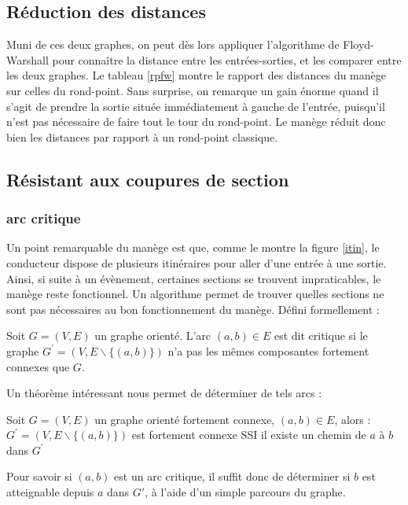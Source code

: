 \documentclass[11pt]{article}
\begin{document}
	
	\subsection{Réduction des distances}
Muni de ces deux graphes, on peut dès lors appliquer l'algorithme de Floyd-Warshall pour connaître la distance entre les entrées-sorties, et les comparer entre les deux graphes. Le tableau \ref{rpfw} montre le rapport des distances du manège sur celles du rond-point. Sans surprise, on remarque un gain énorme quand il s'agit de prendre la sortie située immédiatement à gauche de l'entrée, puisqu'il n'est pas nécessaire de faire tout le tour du rond-point. Le manège réduit donc bien les distances par rapport à un rond-point classique.

	\subsection{Résistant aux coupures de section}
		\subsubsection{arc critique}
	Un point remarquable du manège est que, comme le montre la figure \ref{itin}, le conducteur dispose de plusieurs itinéraires pour aller d'une entrée à une sortie. Ainsi, si suite à un évènement, certaines sections se trouvent impraticables, le manège reste fonctionnel. Un algorithme permet de trouver quelles sections ne sont pas nécessaires au bon fonctionnement du manège. Défini formellement :
\begin{defin}
	Soit $G = (V,E)$ un graphe orienté. L'arc $(a,b) \in E$ est dit critique si le graphe $G^\prime = (V,E\backslash \{(a,b)\})$ n'a pas les mêmes composantes fortement connexes que $G$.
\end{defin}
Un théorème intéressant nous permet de déterminer de tels arcs : 
\begin{theo}
		Soit $G=(V,E)$ un graphe orienté fortement connexe, $(a,b) \in E$, alors :
		$G^\prime = (V,E\backslash \{ (a,b) \})$ est fortement connexe SSI il existe un chemin de $a$ à $b$
		dans $G^\prime$
\end{theo}
Pour savoir si $(a,b)$ est un arc critique, il suffit donc de déterminer si $b$ est atteignable depuis $a$ dans $G\prime$, à l'aide d'un simple parcours du graphe.
\end{document}
